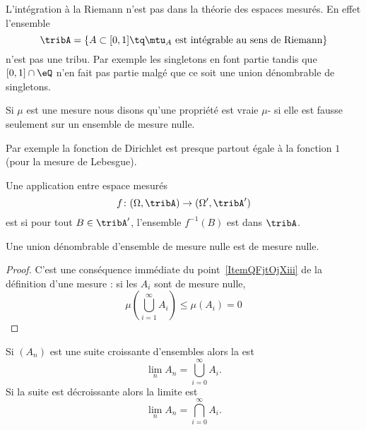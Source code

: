 \begin{example}
    L'intégration à la Riemann n'est pas dans la théorie des espaces mesurés. En effet l'ensemble
    \begin{equation}
        \tribA=\{   A\subset\mathopen[ 0 , 1 \mathclose]\tq   \mtu_A\text{ est intégrable au sens de Riemann}   \}
    \end{equation}
    n'est pas une tribu. Par exemple les singletons en font partie tandis que \( \mathopen[ 0 , 1 \mathclose]\cap \eQ\) n'en fait pas partie malgé que ce soit une union dénombrable de singletons.
\end{example}

\begin{definition}
    Si \( \mu\) est une mesure nous disons qu'une propriété est vraie \( \mu\)- si elle est fausse seulement sur un ensemble de mesure nulle.
\end{definition}

Par exemple la fonction de Dirichlet est presque partout égale à la fonction \( 1\) (pour la mesure de Lebesgue).

\begin{definition}
    Une application entre espace mesurés
    \begin{equation}
        f\colon (\Omega,\tribA)\to (\Omega',\tribA')
    \end{equation}
    est  si pour tout \( B\in\tribA'\), l'ensemble \( f^{-1}(B)\) est dans \( \tribA\).
\end{definition}

\begin{lemma}   \label{LemIDITgAy}
    Une union dénombrable d'ensemble de mesure nulle est de mesure nulle.
\end{lemma}

\begin{proof}
    C'est une conséquence immédiate du point~\ref{ItemQFjtOjXiii} de la définition d'une mesure : si les \( A_i\) sont de mesure nulle,
    \begin{equation}
        \mu\left( \bigcup_{i=1}^{\infty}A_i \right)\leq \mu(A_i)=0
    \end{equation}
\end{proof}

\begin{definition}
    Si \( (A_n)\) est une suite croissante d'ensembles alors la  est
    \begin{equation}
        \lim_nA_n=\bigcup_{i=0}^{\infty}A_i.
    \end{equation}
    Si la suite est décroissante alors la limite est
    \begin{equation}
        \lim_nA_n=\bigcap_{i=0}^{\infty}A_i.
    \end{equation}
\end{definition}


